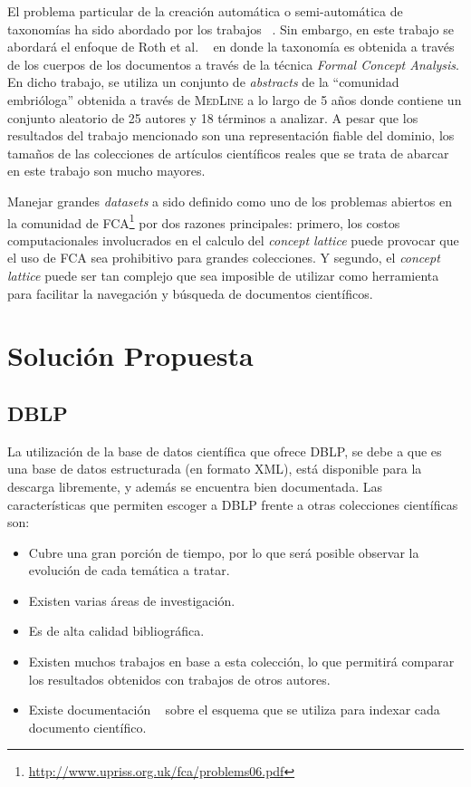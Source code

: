 \documentclass[12pt,oneside,letterpaper]{book}
\newcommand{\eng}[1]{\textit{#1}\xspace}			%
\newcommand{\abr}[1]{\textsc{#1}\xspace}           %
\theoremstyle{definition}
\begin{document}
El problema particular de la creación automática o semi-automática de taxonomías ha sido abordado por los trabajos ~\cite{cimiano2005learning,dakka2005automatic,kominek1997accessing,yeh2008ontology}. Sin embargo, en este trabajo se abordará el enfoque de Roth et al. ~\cite{roth2008towards} en donde la taxonomía es obtenida a través de los cuerpos de los documentos a través de la técnica \eng{Formal Concept Analysis}. En dicho trabajo, se utiliza un conjunto de \eng{abstracts} de la ``comunidad embrióloga'' obtenida a través de \abr{MedLine} a lo largo de 5 años donde contiene un conjunto aleatorio de 25 autores y 18 términos a analizar. A pesar que los resultados del trabajo mencionado son una representación fiable del dominio, los tamaños de las colecciones de artículos científicos reales que se trata de abarcar en este trabajo son mucho mayores.

Manejar grandes \eng{datasets} a sido definido como uno de los problemas abiertos en la comunidad de \abr{FCA}\footnote{\url{http://www.upriss.org.uk/fca/problems06.pdf}} por dos razones principales: primero, los costos computacionales involucrados en el calculo del \eng{concept lattice} puede provocar que el uso de \abr{FCA} sea prohibitivo para grandes colecciones. Y segundo, el \eng{concept lattice} puede ser tan complejo que sea imposible de utilizar como herramienta para facilitar la navegación y búsqueda de documentos científicos. 


\chapter{Solución Propuesta}
\section{DBLP}
\label{sec:sol_dblp}
La utilización de la base de datos científica que ofrece DBLP, se debe a que es una base de datos estructurada (en formato XML), está disponible para la descarga libremente, y además se encuentra bien documentada. Las características que permiten escoger a \abr{DBLP} frente a otras colecciones científicas son:

\begin{itemize}
	\item Cubre una gran porción de tiempo, por lo que será posible observar la evolución de cada temática a tratar.
	\item Existen varias áreas de investigación.
	\item Es de alta calidad bibliográfica.
	\item Existen muchos trabajos en base a esta colección, lo que permitirá comparar los resultados obtenidos con trabajos de otros autores.
	\item Existe documentación ~\cite{ley2009dblp} sobre el esquema que se utiliza para indexar cada documento científico.
\end{itemize}
\end{document}
